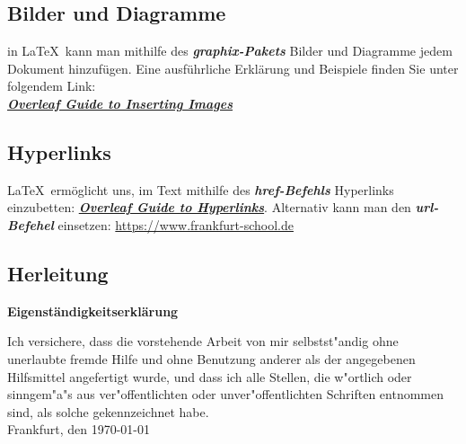 \documentclass[12pt,a4paper]{article}
\begin{document}
\subsection{Bilder und Diagramme}
in \LaTeX\ kann man mithilfe des {\textbf{\emph {graphix-Pakets}}} Bilder und Diagramme jedem Dokument hinzufügen. Eine ausführliche Erklärung und Beispiele finden Sie unter folgendem Link:\\
\href{https://de.overleaf.com/learn/latex/Inserting_Images}{\textbf{\emph{Overleaf Guide to Inserting Images}}}

\subsection{Hyperlinks}
\LaTeX\ ermöglicht uns, im Text mithilfe des \textbf{\emph{href-Befehls}}  Hyperlinks einzubetten:\newline
\href{https://www.overleaf.com/learn/latex/Hyperlinks}{\textbf{\emph{Overleaf Guide to Hyperlinks}}}.\newline
Alternativ kann man den {\textbf{\emph{url-Befehel}}} einsetzen: \url{https://www.frankfurt-school.de}

\begin{appendix}
\section{Herleitung}

\end{appendix}




\newpage
\markboth{}{}

\newpage
{} %
\renewcommand{\refname}{Literaturverzeichnis}


\newpage
\thispagestyle{empty}
\markboth{}{}
  \normalsize
\begin{center}
\huge{\bf Eigenständigkeitserklärung}\\[40mm]
\end{center}
\large
Ich versichere, dass die vorstehende Arbeit von mir selbstst"andig ohne unerlaubte fremde Hilfe und ohne Benutzung anderer als der angegebenen Hilfsmittel angefertigt wurde, und dass ich alle Stellen, die w"ortlich oder sinngem"a"s aus ver"offentlichten oder unver"offentlichten Schriften entnommen sind, als solche gekennzeichnet habe.\\[50mm]
Frankfurt, den \today

\newpage
\end{document}
